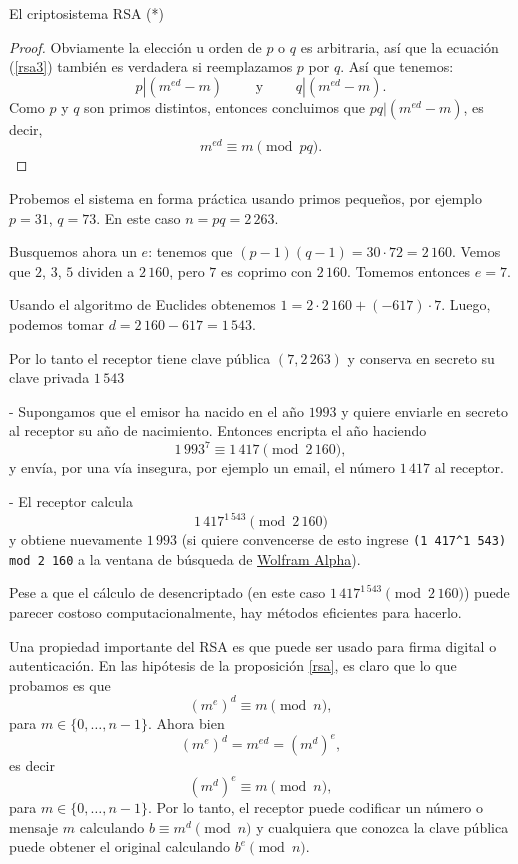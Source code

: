 \begin{section}{El criptosistema RSA (*)}
\begin{proof}
Obviamente la elección u orden de $p$ o $q$ es arbitraria, así que la ecuación (\ref{rsa3}) también es verdadera si reemplazamos $p$ por $q$. Así que tenemos:
$$p|(m^{ed}-m) \qquad \text{ y } \qquad q|(m^{ed}-m).$$
Como $p$ y $q$ son primos distintos, entonces concluimos que $pq|(m^{ed}-m)$, es decir, $$m^{ed} \equiv m \pmod{pq}.$$
\end{proof}

\begin{ejemplo*} Probemos el sistema en forma práctica usando primos pequeños, por ejemplo $p=31$, $q=73$. En este caso $n = pq = 2\,263$. 

Busquemos ahora un $e$:  tenemos que $ (p-1)(q-1)= 30\cdot 72 = 2\,160$. Vemos que $2$, $3$, $5$ dividen a $2\,160$, pero $7$ es coprimo con $2\,160$. 
Tomemos entonces $e = 7$.

Usando el algoritmo de Euclides obtenemos $1 = 2\cdot 2\,160 + (-617)\cdot 7$. Luego, podemos tomar $d = 2\,160 -617 =1\,543$. 

Por lo tanto el receptor tiene clave pública $(7,2\,263)$ y conserva en secreto  su clave privada $1\,543$

- Supongamos que el emisor ha nacido en el año $1993$ y quiere enviarle en secreto al receptor su año de nacimiento. Entonces encripta el año haciendo 
$$
1\,993^7 \equiv 1\,417 \pmod{2\,160},
$$   
y envía, por una vía insegura, por ejemplo un email, el número $1\,417$ al receptor.

- El receptor calcula
$$
1\,417^{1\,543} \pmod{2\,160}
$$ 
y obtiene nuevamente $1\,993$ (si quiere convencerse de esto ingrese \texttt{(1\,417\^{}1\,543) mod 2\,160} a la ventana de búsqueda de \href{https://www.wolframalpha.com}{Wolfram Alpha}).

Pese a que el cálculo de desencriptado (en este caso $1\,417^{1\,543} \pmod{2\,160}$) puede parecer costoso computacionalmente, hay métodos eficientes para hacerlo. 

\end{ejemplo*}


Una propiedad importante del RSA es que puede ser usado para firma digital o autenticación. En las hipótesis de la proposición \ref{rsa}, es claro que lo que probamos es que 
$$
(m^e)^d \equiv m \pmod{n},
$$
para $m \in \{0,\ldots,n-1\}$. Ahora bien 
$$
(m^e)^d  = m^{ed} = (m^d)^e,  
$$
es decir
$$
(m^d)^e \equiv m \pmod{n}, 
$$
para $m \in \{0,\ldots,n-1\}$. Por lo tanto, el receptor puede codificar un número o mensaje $m$ calculando  $b \equiv m^d  \pmod{n}$ y cualquiera que conozca la clave pública puede obtener el original calculando $b^e \pmod{n}$. 


\end{section}
